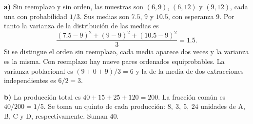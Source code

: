 \textbf{a)} Sin reemplazo y sin orden, las muestras son
$(6,9)$, $(6,12)$ y $(9,12)$, cada una con probabilidad $1/3$.
Sus medias son $7.5$, $9$ y $10.5$, con esperanza 9.
Por tanto la varianza de la distribución de las medias es
\[
\frac{(7.5-9)^2+(9-9)^2+(10.5-9)^2}{3}=\boxed{1.5}.
\]
Si se distingue el orden sin reemplazo, cada media aparece
dos veces y la varianza es la misma. Con reemplazo hay
nueve pares ordenados equiprobables. La varianza poblacional
es $(9+0+9)/3=6$ y la de la media de dos extracciones
independientes es $6/2=3$.

\textbf{b)} La producción total es $40+15+25+120=200$.
La fracción común es $40/200=1/5$. Se toma un quinto
de cada producción: $\boxed{8,\ 3,\ 5,\ 24}$ unidades
de A, B, C y D, respectivamente. Suman 40.

